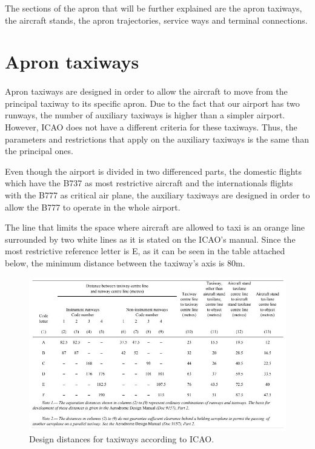 	
	The sections of the apron that will be further explained are the apron taxiways, the aircraft stands, the apron trajectories, service ways and terminal connections. 
	
	\section{Apron taxiways}
	\paragraph{}Apron taxiways are designed in order to allow the aircraft to move from the principal taxiway to its specific apron. Due to the fact that our airport has two runways, the number of auxiliary taxiways is higher than a simpler airport. However, ICAO does not have a different criteria for these taxiways. Thus, the parameters and restrictions that apply on the auxiliary taxiways is the same than the principal ones.
	
	Even though the airport is divided in two differenced parts, the domestic flights which have the B737 as most restrictive aircraft and the internationals flights with the B777 as critical air plane, the auxiliary taxiways are designed in order to allow the B777 to operate in the whole airport.
	
	The line that limits the space where aircraft are allowed to taxi is an orange line surrounded by two white lines as it is stated on the ICAO's manual. Since the most restrictive reference letter is E, as it can be seen in the table attached below, the minimum distance between the taxiway's axis is 80m.
	
	\begin{figure}[H]
	\centering
	\includegraphics[clip, trim=0cm 0cm 0cm 0cm, width=1\textwidth]{./images/Annex14/minimumdistancetaxiways}
	\caption{Design distances for taxiways according to ICAO.} %
	\label{} %
	\end{figure}

